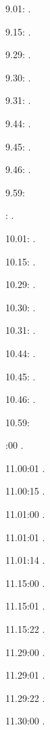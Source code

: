 \label{key}\documentclass[italian]{article}
\begin{document}
9.01:   . 

9.15:   . 

9.29:   . 

9.30:   .

9.31:   .

9.44:   .

9.45:   .

9.46:   .

9.59:   

:  .

10.01:   . 

10.15:   . 

10.29:   . 

10.30:   .

10.31:   .

10.44:   .

10.45:   .

10.46:   .

10.59:   

:00  .

11.00:01  .

11.00:15  .

11.01:00   . 

11.01:01   . 

11.01:14   . 

11.15:00   . 

11.15:01   . 

11.15:22   . 

11.29:00   . 

11.29:01   . 

11.29:22   . 

11.30:00   .
\end{document}
